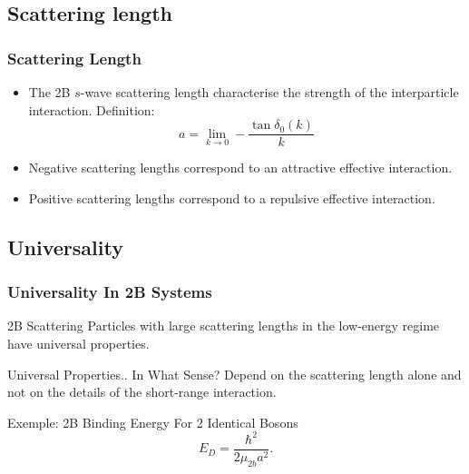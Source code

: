 \documentclass[hideothersubsections]{beamer}
\begin{document}

\subsection{Scattering length}
\begin{frame}
\frametitle{Scattering Length}
\begin{itemize}
	\item The 2B $s$-wave scattering length characterise the strength of the interparticle interaction. Definition:
	\begin{equation}
	a = \lim_{k \to 0} -\frac{\tan\delta_0(k)}{k}
	\end{equation}
	\item Negative scattering lengths correspond to an attractive effective interaction.
	\item Positive scattering lengths correspond to a repulsive effective interaction.
\end{itemize}
\end{frame}

\subsection{Universality}
\begin{frame}
\frametitle{Universality In 2B Systems}
\begin{block}{2B Scattering}
	Particles with large scattering lengths in the low-energy regime have universal properties. 
\end{block}

\begin{block}{Universal Properties.. In What Sense?}
	Depend on the scattering length alone and not on the details of the short-range interaction.
\end{block}

\begin{block}{Exemple: 2B Binding Energy For 2 Identical Bosons}
	\begin{equation}
	E_D = \frac{\hbar^2}{2 \mu_{2b} a^2}.
	\end{equation}
\end{block}
\end{frame}
\end{document}
